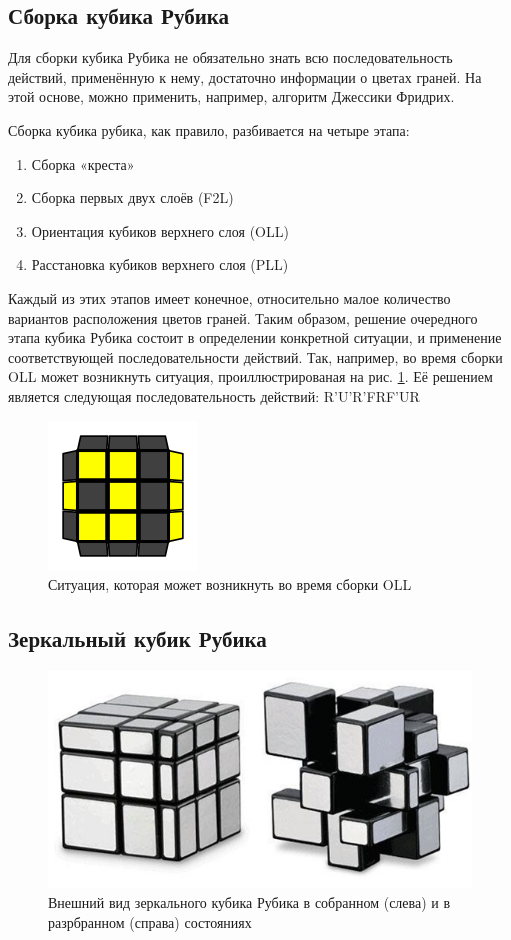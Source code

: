 \documentclass[a4paper, 14pt]{report}
\begin{document}
	\subsection{Сборка кубика Рубика}
	Для сборки кубика Рубика не обязательно знать всю последовательность действий, применённую к нему, достаточно информации о цветах граней. На этой основе, можно применить, например, алгоритм Джессики Фридрих.
	
	Сборка кубика рубика, как правило, разбивается на четыре этапа:
	\begin{enumerate}
		\item Сборка «креста»
		\item Сборка первых двух слоёв (F2L)
		\item Ориентация кубиков верхнего слоя (OLL)
		\item Расстановка кубиков верхнего слоя (PLL)
	\end{enumerate}
	
	Каждый из этих этапов имеет конечное, относительно малое количество вариантов расположения цветов граней. Таким образом, решение очередного этапа кубика Рубика состоит в определении конкретной ситуации, и применение соответствующей последовательности действий. Так, например, во время сборки OLL может возникнуть ситуация, проиллюстрированая на рис. \ref{fig:c_shape}. Её решением является следующая последовательность действий: R'U'R'FRF'UR
	
	\begin{figure}[ht]
		\centering
		\includegraphics[width=0.25\linewidth]{c_shape}
		\caption{Ситуация, которая может возникнуть во время сборки OLL}
		\label{fig:c_shape}
	\end{figure}
		
	\subsection{Зеркальный кубик Рубика}
	\begin{figure}[ht]
		\centering
		\includegraphics[width=1\linewidth]{mirrored_rubics_cube}
		\caption{Внешний вид зеркального кубика Рубика в собранном (слева) и в разрбранном (справа) состояниях}
		\label{fig:mirrored_cube}
	\end{figure}
\end{document}
